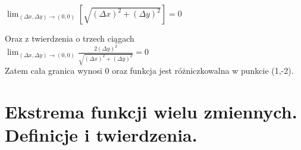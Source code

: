 \documentclass[main.tex]{subfiles}
\begin{document}
\begin{itemize}
        $ \lim_{(\Delta x, \Delta y) \rightarrow (0,0)} \left[ \sqrt{(\Delta x)^2 + (\Delta y)^2} \right] = 0$\newline

        Oraz z twierdzenia o trzech ciągach\newline
        \\
        $\lim_{(\Delta x, \Delta y) \rightarrow (0,0)} \frac{2(\Delta y)^2}{\sqrt{(\Delta x)^2 + (\Delta y)^2}} = 0 $\newline
        \\
        Zatem cała granica wynosi 0 oraz funkcja jest różniczkowalna w punkcie (1,-2).


    \end{itemize}

    \newpage

    \section{Ekstrema funkcji wielu zmiennych. Definicje i twierdzenia.}
\end{document}
